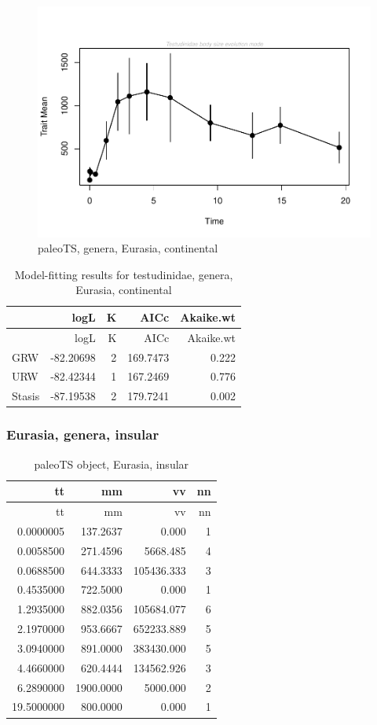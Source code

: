 \begin{figure}[H]
	\centering
	\includegraphics{MA_JJ_files/figure-latex/pTSEsC-1.pdf}
	\caption{paleoTS, genera, Eurasia, continental}
	\label{fig:pTSEsC}
\end{figure}

\begin{longtable}[]{@{}lrrrr@{}}
	\caption{Model-fitting results for testudinidae, genera, Eurasia,
		continental}
	\label{tab:pTSEsCEM}\tabularnewline
	\toprule
	& logL & K & AICc & Akaike.wt\tabularnewline
	\midrule
	\endfirsthead
	\toprule
	& logL & K & AICc & Akaike.wt\tabularnewline
	\midrule
	\endhead
	GRW & -82.20698 & 2 & 169.7473 & 0.222\tabularnewline
	URW & -82.42344 & 1 & 167.2469 & 0.776\tabularnewline
	Stasis & -87.19538 & 2 & 179.7241 & 0.002\tabularnewline
	\bottomrule
\end{longtable}


\FloatBarrier

\subsubsection{Eurasia, genera,
	insular}\label{eurasiagenera-insular}

\begin{longtable}[]{@{}rrrr@{}}
	\caption{paleoTS object, Eurasia, insular}
	\label{tab:pTSEsI}\tabularnewline
	\toprule
	tt & mm & vv & nn\tabularnewline
	\midrule
	\endfirsthead
	\toprule
	tt & mm & vv & nn\tabularnewline
	\midrule
	\endhead
	0.0000005 & 137.2637 & 0.000 & 1\tabularnewline
	0.0058500 & 271.4596 & 5668.485 & 4\tabularnewline
	0.0688500 & 644.3333 & 105436.333 & 3\tabularnewline
	0.4535000 & 722.5000 & 0.000 & 1\tabularnewline
	1.2935000 & 882.0356 & 105684.077 & 6\tabularnewline
	2.1970000 & 953.6667 & 652233.889 & 5\tabularnewline
	3.0940000 & 891.0000 & 383430.000 & 5\tabularnewline
	4.4660000 & 620.4444 & 134562.926 & 3\tabularnewline
	6.2890000 & 1900.0000 & 5000.000 & 2\tabularnewline
	19.5000000 & 800.0000 & 0.000 & 1\tabularnewline
	\bottomrule
\end{longtable}

